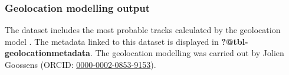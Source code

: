 \documentclass[
  authoryear,
  review,
  3p]{elsarticle}
\begin{document}
\hypertarget{geolocation-modelling-output}{%
\subsubsection*{Geolocation modelling
output}\label{geolocation-modelling-output}}

The dataset includes the most probable tracks calculated by the
geolocation model \citep[the reader is referred to][ for further
explanation of the model, filename:
\texttt{geolocation\_output\_raw\_data.csv}]{goossens_2023}. The
metadata linked to this dataset is displayed in
\textbf{?@tbl-geolocationmetadata}. The geolocation modelling was
carried out by Jolien Goossens (ORCID:
\href{https://orcid.org/0000-0002-0853-9153}{0000-0002-0853-9153}).
\end{document}
